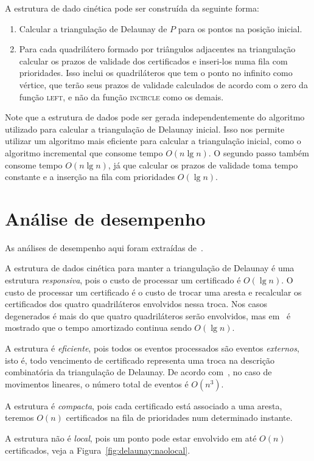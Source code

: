 A estrutura de dado cinética pode ser construída da seguinte forma:
\begin{enumerate}
    \item Calcular a triangulação de Delaunay de $P$ para os pontos na posição inicial.
    \item Para cada quadrilátero formado por triângulos adjacentes na triangulação calcular os
    prazos de validade dos certificados e inseri-los numa fila com prioridades.
    Isso inclui os quadriláteros que tem o ponto no infinito como vértice, que terão seus prazos
    de validade calculados de acordo com o zero da função \textsc{left}, e não da função
    \textsc{incircle} como os demais.
\end{enumerate}

Note que a estrutura de dados pode ser gerada independentemente do algoritmo utilizado para
calcular a triangulação de Delaunay inicial.
Isso nos permite utilizar um algoritmo mais eficiente para calcular a triangulação inicial, como o
algoritmo incremental que consome tempo $O(n\lg{n})$.
O segundo passo também consome tempo $O(n\lg{n})$, já que calcular os prazos de validade toma
tempo constante e a inserção na fila com prioridades $O(\lg{n})$.


\section{Análise de desempenho}\label{sec:delaunay:analise-de-desempenho}

As análises de desempenho aqui foram extraídas de~\cite{eduardo}.

A estrutura de dados cinética para manter a triangulação de Delaunay é uma estrutura
\textit{responsiva}, pois o custo de processar um certificado é $O(\lg{n})$.
O custo de processar um certificado é o custo de trocar uma aresta e recalcular os certificados dos
quatro quadriláteros envolvidos nessa troca.
Nos casos degenerados é mais do que quatro quadriláteros serão envolvidos, mas
em~\cite{guibas-mitchell-roos} é mostrado que o tempo amortizado continua sendo $O(\lg{n})$.

A estrutura é \textit{eficiente}, pois todos os eventos processados são eventos \textit{externos},
isto é, todo vencimento de certificado representa uma troca na descrição combinatória da
triangulação de Delaunay.
De acordo com~\cite{eduardo}, no caso de movimentos lineares, o número total de eventos é
$O(n^3)$.

A estrutura é \textit{compacta}, pois cada certificado está associado a uma aresta, teremos
$O(n)$ certificados na fila de prioridades num determinado instante.

A estrutura não é \textit{local}, pois um ponto pode estar envolvido em até $O(n)$
certificados, veja a Figura~\ref{fig:delaunay:naolocal}.
